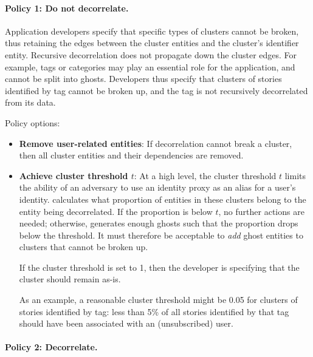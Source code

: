 \paragraph{Policy 1: Do not decorrelate.}

Application developers specify that specific types of clusters cannot be broken, thus retaining the edges between the cluster entities and the cluster's identifier entity.
Recursive decorrelation does not propagate down the cluster edges. 
For example, tags or categories may play an essential role
for the application, and cannot be split into ghosts. Developers thus specify that clusters of stories 
identified by tag cannot be broken up, and the tag is not recursively decorrelated from its data.

\vspace{12pt}
\noindent Policy options:
\begin{itemize}
    \item \textbf{Remove user-related entities}: If decorrelation cannot break a cluster, then all
        cluster entities and their dependencies are removed.

    \item \textbf{Achieve cluster threshold $t$}:  At a high level, the cluster threshold
        $t$ limits the ability of an adversary to use an identity proxy as an alias for a user's
        identity.  \sys{} calculates what proportion of entities in these clusters belong to the
        entity being decorrelated. If the proportion is below $t$, no further actions are needed;
        otherwise, \sys{} generates enough ghosts such that the proportion drops below the
        threshold. It must therefore be acceptable to \emph{add} ghost entities to clusters that cannot be broken up. 

        If the cluster threshold is set to 1, then the developer is specifying that the cluster
        should remain as-is.

        As an example, a reasonable cluster threshold might be 0.05 for clusters of stories identified by
        tag: less than 5\% of all stories identified by that tag should have been associated with an
        (unsubscribed) user. 

\end{itemize}

\paragraph{Policy 2: Decorrelate.}

